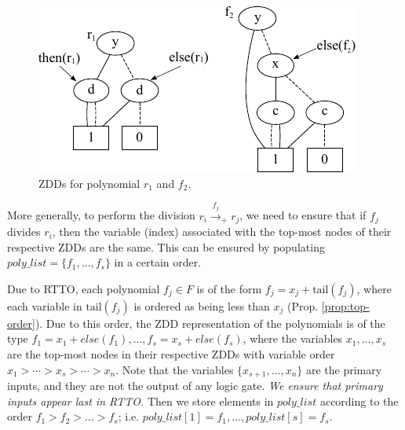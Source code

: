 \begin{figure}[hbt]
\centering
\includegraphics[scale=1]{figures/r1_f2.pdf}
\caption{ZDDs for polynomial $r_1$ and $f_2$.}
\label{f2}
\end{figure}

More generally, to perform the division $r_i \xrightarrow{f_j}_+ r_j$, 
we need to ensure that if $f_j$ divides $r_i$, then the variable
(index) associated with the top-most nodes of  their respective ZDDs
are the same. This can be ensured by populating
$poly\_list=\{f_1,\dots,f_s\}$ in a certain order.

Due to RTTO, each polynomial $f_j \in F$ is of the form $f_j = x_j +
\text{tail}(f_j)$, where each variable in $\text{tail}(f_j)$
is ordered as being less than $x_j$ (Prop. \ref{prop:top-order}). Due to this order,
the ZDD representation of the polynomials is of the type $f_1= x_1 +
else(f_1), \dots, f_s= x_s + else(f_s)$, where the variables $x_1,\dots,x_s$ are the 
top-most nodes in their respective ZDDs with variable order $x_1 >
\cdots > x_s > \cdots > x_n$. Note that the variables
$\{x_{s+1},\dots,x_{n}\}$ are the primary inputs, and they are not the output
of any logic gate. {\it We ensure that primary inputs appear last in RTTO.}
Then we store elements in $poly\_list$ according to the order
$f_1 > f_2 > \dots > f_s$; i.e. $poly\_list[1] = f_1,
\dots,poly\_list[s] = f_s$. 

